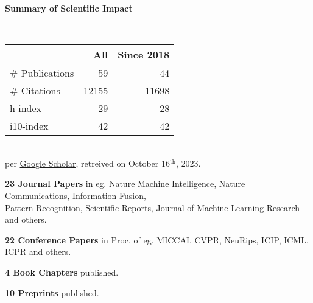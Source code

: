 \headedsection %
{\bf Summary of Scientific Impact}{}{}
{
    \qquad~~~~
    \begin{minipage}[t]{0.6\textwidth}
        \begin{tabular}{lrr}
        \hline
         & All & Since 2018\\
        \hline
        \# Publications & 59     & 44    \\
        \# Citations    & 12155  & 11698 \\
        h-index         & 29     & 28    \\
        i10-index       & 42     & 42    \\
        \hline
    \end{tabular}
    \\
    {\footnotesize{
        per \href{https://scholar.google.com/citations?user=wpLQuroAAAAJ}{Google Scholar},
        retreived on October 16$^\text{th}$, 2023.
        }
    }
    \end{minipage}

    \ifdefined\shortcv
        \vstep
        {\bf 23 Journal Papers} in eg. Nature Machine Intelligence, Nature Communications, Information Fusion,\\
        \hspace*{\fill} Pattern Recognition, Scientific Reports, Journal of Machine Learning Research and others.

        {\bf 22 Conference Papers} in Proc. of eg. MICCAI, CVPR, NeuRips, ICIP, ICML, ICPR and others.

        {\bf 4 Book Chapters} published.

        {\bf 10 Preprints} published.
        
    \else
        {}
    \fi

}
